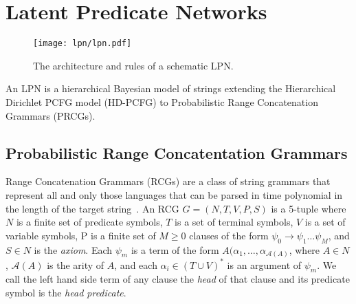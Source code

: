 \documentclass[10pt, twocolumn]{article}
\begin{document}

\section{Latent Predicate Networks}

\begin{figure}[t]
		\texttt{[image: lpn/lpn.pdf]}
		\caption{The architecture and rules of a schematic LPN.}
		\label{fig:architecture}
\end{figure}

An LPN is a hierarchical Bayesian model of strings
extending the Hierarchical Dirichlet PCFG model (HD-PCFG) to
Probabilistic Range Concatenation Grammars (PRCGs). 

\subsection{Probabilistic Range Concatentation Grammars}
Range Concatenation Grammars (RCGs) are a class of string grammars
that represent all and only those languages that can be parsed in time
polynomial in the length of the target
string~\cite{boullier2005range}. An RCG $G=(N, T, V, P, S)$ is a
5-tuple where $N$ is a finite set of predicate symbols, $T$ is a set
of terminal symbols, $V$ is a set of variable symbols, P is a finite
set of $M \geq 0$ clauses of the form $\psi_0 \rightarrow \psi_1 \dots
\psi_M$, and $S \in N$ is the \emph{axiom}. Each $\psi_m$ is a term of
the form $A(\alpha_1, \dots, \alpha_{\mathcal{A}(A)}$, where $A \in
N$, $\mathcal{A}(A)$ is the arity of $A$, and each $\alpha_i \in (T
\cup V)^*$ is an argument of $\psi_m$. We call the left hand side term
of any clause the \emph{head} of that clause and its predicate symbol
is the \emph{head predicate}.

\end{document}
